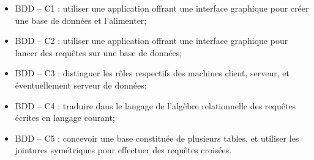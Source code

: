 \documentclass[10pt]{article}
\begin{document}

\vspace{.5cm}

\begin{savoir}
\begin{itemize}
\item BDD -- C1 : utiliser une application offrant une interface graphique pour créer une base de données et l’alimenter;
\item BDD -- C2 : utiliser une application offrant une interface graphique pour lancer des requêtes sur une base de données;
\item BDD -- C3 : distinguer les rôles respectifs des machines client, serveur, et éventuellement serveur de données;
\item BDD -- C4 : traduire dans le langage de l’algèbre relationnelle des requêtes écrites en langage courant;
\item BDD -- C5 : concevoir une base constituée de plusieurs tables, et utiliser les jointures symétriques pour effectuer des requêtes croisées.
\end{itemize}
\end{savoir}



\setlength{\parskip}{0ex plus 0.2ex minus 0ex}
 \renewcommand{\contentsname}{}
 \renewcommand{\baselinestretch}{1}

\tableofcontents

 \renewcommand{\baselinestretch}{1.2}
\setlength{\parskip}{2ex plus 0.5ex minus 0.2ex}


\end{document}
